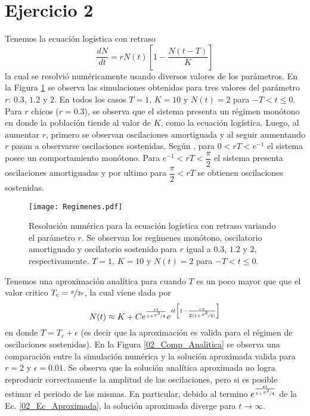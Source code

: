 \section*{Ejercicio 2}
\graphicspath{{Figuras/ej_02/}}

Tenemos la ecuación logística con retraso
\begin{equation}
    \frac{dN}{dt} = r N(t) \left[1- \frac{N(t-T)}{K}\right]
\end{equation}
la cual se resolvió numéricamente usando diversos valores de los parámetros. En la Figura \ref{02_ejercicio} se observa las simulaciones obtenidas para tres valores del parámetro $r$: $0.3$, $1.2$ y $2$. En todos los casos $T=1$, $K=10$ y $N(t)=2$ para $-T < t \leq 0$. Para $r$ chicos ($r=0.3$), se observa que el sistema presenta un régimen monótono en donde la población tiende al valor de $K$, como la ecuación logística. Luego, al aumentar $r$, primero se observan oscilaciones amortiguada y al seguir aumentando $r$ pasan a observarse oscilaciones sostenidas. Según \cite{Chule},  para $0<rT<e^{-1}$ el sistema posee un comportamiento monótono. Para $e^{-1} < rT < \dfrac{\pi}{2}$ el sistema presenta oscilaciones amortiguadas y por ultimo para $\dfrac{\pi}{2} < rT$ se obtienen oscilaciones sostenidas.

\begin{figure}
    \centering
    \texttt{[image: Regimenes.pdf]}
    \caption{Resolución numérica para la ecuación logística con retraso variando el parámetro $r$. Se observan los regímenes monótono, oscilatorio amortiguado y oscilatorio sostenido para $r$ igual a $0.3$, $1.2$ y $2$, respectivamente. $T=1$, $K=10$ y $N(t)=2$ para $-T < t \leq 0$.}
    \label{02_ejercicio}
\end{figure}

Tenemos una aproximación analítica para cuando $T$ es un poco mayor que que el valor critico $T_c = \nicefrac{\pi}{2r}$, la cual viene dada por
\begin{equation}
    N(t) \approx K + C e^{ \frac{\epsilon t}{1 + \nicefrac{\pi^{2}}{4}} } e^{it \left[ 1- \frac{\epsilon \pi}{2 ( 1 + \nicefrac{\pi^{2}}{4})} \right]}
    \label{02_Ec_Aproximada}
\end{equation}
en donde $T = T_c + \epsilon$ (es decir que la aproximación es valida para el régimen de oscilaciones sostenidas). En la Figura \ref{02_Comp_Analitica} se observa una comparación entre la simulación numérica y la solución aproximada valida para $r=2$ y $\epsilon=0.01$. Se observa que la solución analítica aproximada no logra reproducir correctamente la amplitud de las oscilaciones, pero si es posible estimar el periodo de las mismas. En particular, debido al termino $e^{ \frac{\epsilon t}{1 + \nicefrac{\pi^{2}}{4}} }$ de la Ec. \ref{02_Ec_Aproximada}, la solución aproximada diverge para $t\rightarrow \infty$.


